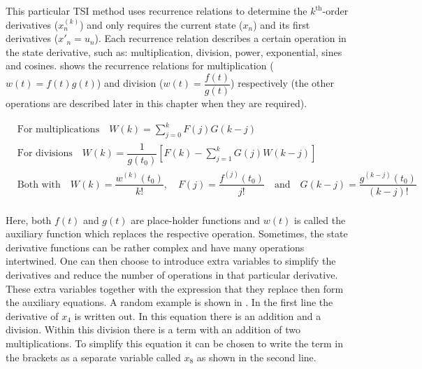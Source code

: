 \noindent
This particular \ac{TSI} method uses recurrence relations to determine the $k^{\text{th}}$-order derivatives ($x^{\left(k\right)}_{n}$) and only requires the current state ($x_{n}$) and its first derivatives ($x'_{n} = u_{n}$). Each recurrence relation describes a certain operation in the state derivative, such as: multiplication, division, power, exponential, sines and cosines.  shows the recurrence relations for multiplication ($w\left(t\right)=f\left(t\right)g\left(t\right)$) and division ($w\left(t\right)=\dfrac{f\left(t\right)}{g\left(t\right)}$) respectively (the other operations are described later in this chapter when they are required).


\begin{equation} \label{eq:rec_rel}
\begin{split}
&\text{For multiplications} \quad W\left(k\right)=\displaystyle\sum_{j=0}^{k}F\left(j\right)G\left(k-j\right)\\
&\text{For divisions} \quad W\left(k\right)=\dfrac{1}{g\left(t_{0}\right)}\left[F\left(k\right)-\displaystyle\sum_{j=1}^{k} G\left(j\right)W\left(k-j\right)\right]\\
& \text{Both with} \quad W\left(k\right)=\dfrac{w^{\left(k\right)}\left(t_{0}\right)}{k!}, \quad F\left(j\right)=\dfrac{f^{\left(j\right)}\left(t_{0}\right)}{j!} \quad \text{and} \quad G\left(k-j\right)=\dfrac{g^{\left(k-j\right)}\left(t_{0}\right)}{\left(k-j\right)!}\\
\end{split}
\end{equation}

\noindent
Here, both $f\left(t\right)$ and $g\left(t\right)$ are place-holder functions and $w\left(t\right)$ is called the auxiliary function which replaces the respective operation. Sometimes, the state derivative functions can be rather complex and have many operations intertwined. One can then choose to introduce extra variables to simplify the derivatives and reduce the number of operations in that particular derivative. These extra variables together with the expression that they replace then form the auxiliary equations. A random example is shown in . In the first line the derivative of $x_{4}$ is written out. In this equation there is an addition and a division. Within this division there is a term with an addition of two multiplications. To simplify this equation it can be chosen to write the term in the brackets as a separate variable called $x_{8}$ as shown in the second line.

